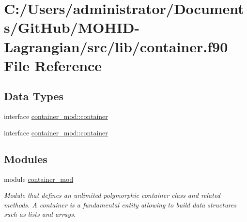 \hypertarget{container_8f90}{}\section{C\+:/\+Users/administrator/\+Documents/\+Git\+Hub/\+M\+O\+H\+I\+D-\/\+Lagrangian/src/lib/container.f90 File Reference}
\label{container_8f90}
\subsection*{Data Types}
\begin{DoxyCompactItemize}
\item 
interface \hyperlink{structcontainer__mod_1_1container}{container\+\_\+mod\+::container}
\item 
interface \hyperlink{structcontainer__mod_1_1container}{container\+\_\+mod\+::container}
\end{DoxyCompactItemize}
\subsection*{Modules}
\begin{DoxyCompactItemize}
\item 
module \hyperlink{namespacecontainer__mod}{container\+\_\+mod}
\begin{DoxyCompactList}\small\item\em Module that defines an unlimited polymorphic container class and related methods. A container is a fundamental entity allowing to build data structures such as lists and arrays. \end{DoxyCompactList}\end{DoxyCompactItemize}

